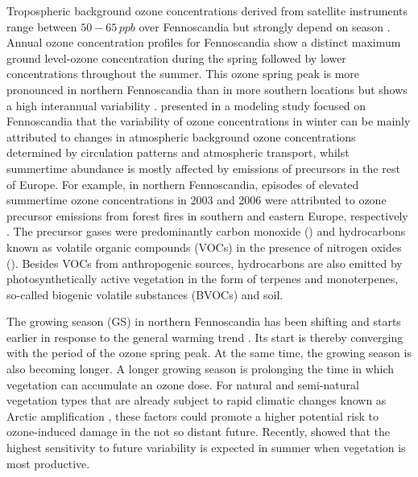\documentclass[bg, manuscript]{copernicus}
\begin{document}
Tropospheric background ozone concentrations derived from satellite instruments range between $50-65\,\unit{ppb}$ over Fennoscandia but strongly depend on season \citep{ESA:Cooper2014}. Annual ozone concentration profiles for Fennoscandia show a distinct maximum ground level-ozone concentration during the spring followed by lower concentrations throughout the summer. This ozone spring peak is more pronounced in northern Fennoscandia than in more southern locations but shows a high interannual variability \citep{AB:Klingberg2009, BER:Klingberg2019}. \citet{ACP:Andersson2017} presented in a modeling study focused on Fennoscandia that the variability of ozone concentrations in winter can be mainly attributed to changes in atmospheric background ozone concentrations determined by circulation patterns and atmospheric transport, whilst summertime abundance is mostly affected by emissions of precursors in the rest of Europe. For example, in northern Fennoscandia, episodes of elevated summertime ozone concentrations in 2003 and 2006 were attributed to ozone precursor emissions from forest fires in southern and eastern Europe, respectively \citep{AE:Lindskog2007,EP:Karlsson2013}. The precursor gases were predominantly carbon monoxide () and hydrocarbons known as volatile organic compounds (VOCs) in the presence of nitrogen oxides (). Besides VOCs from anthropogenic sources, hydrocarbons are also emitted by photosynthetically active vegetation in the form of terpenes and monoterpenes, so-called biogenic volatile substances (BVOCs) and soil.

The growing season (GS) in northern Fennoscandia has been shifting and starts earlier in response to the general warming trend \citep[e.g.,][]{GCB:Menzel2006,RS:Hogda2013,IJB:Karlsen2007}. Its start is thereby converging with the period of the ozone spring peak. At the same time, the growing season is also becoming longer. A longer growing season is prolonging the time in which vegetation can accumulate an ozone dose. For natural and semi-natural vegetation types that are already subject to rapid climatic changes known as Arctic amplification \citep{AMAP2012,IPCC2013}, these factors could promote a higher potential risk to ozone-induced damage in the not so distant future. Recently, \citet{ESPR:Hayes2021} showed that the highest sensitivity to future \chem{[O_3]} variability is expected in summer when vegetation is most productive.
\end{document}
